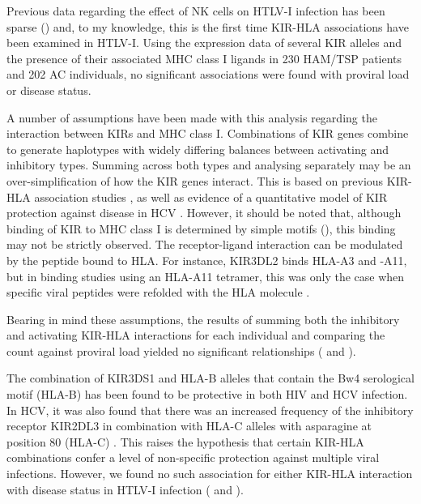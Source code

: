 Previous data regarding the effect of NK cells on HTLV-I infection has been sparse () and, to my knowledge, this is the first time KIR-HLA associations have been examined in HTLV-I. Using the expression data of several KIR alleles and the presence of their associated MHC class I ligands in 230 HAM/TSP patients and 202 AC individuals, no significant associations were found with proviral load or disease status.

A number of assumptions have been made with this analysis regarding the interaction between KIRs and MHC class I. Combinations of KIR genes combine to generate haplotypes with widely differing balances between activating and inhibitory types. Summing across both types and analysing separately may be an over-simplification of how the KIR genes interact. This is based on previous KIR-HLA association studies \citep{Khakoo2006}, as well as evidence of a quantitative model of KIR protection against disease in HCV \citep{Khakoo2004}. However, it should be noted that, although binding of KIR to MHC class I is determined by simple motifs (), this binding may not be strictly observed. The receptor-ligand interaction can be modulated by the peptide bound to HLA. For instance, KIR3DL2 binds HLA-A3 and -A11, but in binding studies using an HLA-A11 tetramer, this was only the case when specific viral peptides were refolded with the HLA molecule \citep{Khakoo2006}.

Bearing in mind these assumptions, the results of summing both the inhibitory and activating KIR-HLA interactions for each individual and comparing the count against proviral load yielded no significant relationships ( and ).

The combination of KIR3DS1 and HLA-B alleles that contain the Bw4 serological motif (HLA-B) has been found to be protective in both HIV \cite{Martin2002,Gaudieri2005} and HCV \cite{Khakoo2004} infection. In HCV, it was also found that there was an increased frequency of the inhibitory receptor KIR2DL3 in combination with HLA-C alleles with asparagine at position 80 (HLA-C) \citep{Khakoo2004}. This raises the hypothesis that certain KIR-HLA combinations confer a level of non-specific protection against multiple viral infections. However, we found no such association for either KIR-HLA interaction with disease status in HTLV-I infection ( and ).


